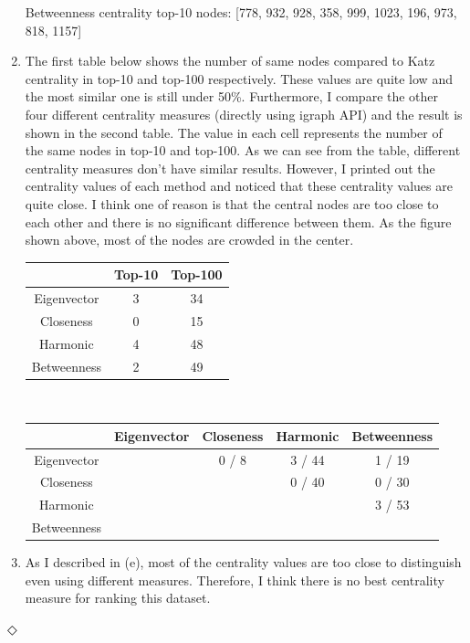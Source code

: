 \documentclass[12pt]{article}
\newcommand{\esolution}{\hfill $\Diamond$ \\ \vspace{.3cm}}
\begin{document}
\begin{enumerate}[label=(\alph*)]
		  Betweenness centrality top-10 nodes: [778, 932, 928, 358, 999, 1023, 196, 973, 818, 1157]
	\item The first table below shows the number of same nodes compared to Katz centrality in top-10 and top-100 respectively. These values are quite low and the most similar one is still under 50\%. Furthermore, I compare the other four different centrality measures (directly using igraph API) and the result is shown in the second table. The value in each cell represents the number of the same nodes in top-10 and top-100. As we can see from the table, different centrality measures don't have similar results. However, I printed out the centrality values of each method and noticed that these centrality values are quite close. I think one of reason is that the central nodes are too close to each other and there is no significant difference between them. As the figure shown above, most of the nodes are crowded in the center.\\[1em]
		\begin{tabular}{|c|c|c|}
			\hline
			& Top-10 & Top-100 \\ \hline
			Eigenvector & 3      & 34      \\ \hline
			Closeness   & 0      & 15      \\ \hline
			Harmonic    & 4      & 48      \\ \hline
			Betweenness & 2      & 49      \\ \hline
		\end{tabular} \\[1em]
		\begin{tabular}{|c|c|c|c|c|}
			\hline
			            & Eigenvector & Closeness & Harmonic & Betweenness \\ \hline
			Eigenvector &             & 0 / 8     & 3 / 44   & 1 / 19      \\ \hline
			Closeness   &             &           & 0 / 40   & 0 / 30      \\ \hline
			Harmonic    &             &           &          & 3 / 53      \\ \hline
			Betweenness &             &           &          &             \\ \hline
		\end{tabular}
	\item As I described in (e), most of the centrality values are too close to distinguish even using different measures. Therefore, I think there is no best centrality measure for ranking this dataset.
\end{enumerate}
\esolution
\end{document}
